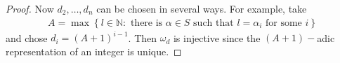 \documentclass[DIV=14,parskip=half]{scrartcl}
\theoremstyle{definition}
\newcommand{\N}{\mathbb{N}}
\begin{document}
\begin{proof}
Now $d_2,\ldots,d_n$ can be chosen in several ways. For example, take
\begin{align*}
 A = \max\left\{l\in\N: \text{ there is }\alpha\in S \text{ such that } l =\alpha_i \text{ for some } i\right\}
\end{align*}
and chose $d_i = (A+1)^{i-1}$. Then $\omega_d$ is injective since the $(A+1)-$adic representation of an integer is unique.


\end{proof}
\end{document}
